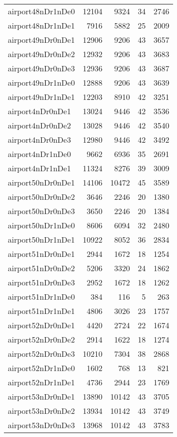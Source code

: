 \begin{tabular}{lrrrr}
airport48nDr1nDe0 & 12104 & 9324 & 34 & 2746 \\
airport48nDr1nDe1 & 7916 & 5882 & 25 & 2009 \\
airport49nDr0nDe1 & 12906 & 9206 & 43 & 3657 \\
airport49nDr0nDe2 & 12932 & 9206 & 43 & 3683 \\
airport49nDr0nDe3 & 12936 & 9206 & 43 & 3687 \\
airport49nDr1nDe0 & 12888 & 9206 & 43 & 3639 \\
airport49nDr1nDe1 & 12203 & 8910 & 42 & 3251 \\
airport4nDr0nDe1 & 13024 & 9446 & 42 & 3536 \\
airport4nDr0nDe2 & 13028 & 9446 & 42 & 3540 \\
airport4nDr0nDe3 & 12980 & 9446 & 42 & 3492 \\
airport4nDr1nDe0 & 9662 & 6936 & 35 & 2691 \\
airport4nDr1nDe1 & 11324 & 8276 & 39 & 3009 \\
airport50nDr0nDe1 & 14106 & 10472 & 45 & 3589 \\
airport50nDr0nDe2 & 3646 & 2246 & 20 & 1380 \\
airport50nDr0nDe3 & 3650 & 2246 & 20 & 1384 \\
airport50nDr1nDe0 & 8606 & 6094 & 32 & 2480 \\
airport50nDr1nDe1 & 10922 & 8052 & 36 & 2834 \\
airport51nDr0nDe1 & 2944 & 1672 & 18 & 1254 \\
airport51nDr0nDe2 & 5206 & 3320 & 24 & 1862 \\
airport51nDr0nDe3 & 2952 & 1672 & 18 & 1262 \\
airport51nDr1nDe0 & 384 & 116 & 5 & 263 \\
airport51nDr1nDe1 & 4806 & 3026 & 23 & 1757 \\
airport52nDr0nDe1 & 4420 & 2724 & 22 & 1674 \\
airport52nDr0nDe2 & 2914 & 1622 & 18 & 1274 \\
airport52nDr0nDe3 & 10210 & 7304 & 38 & 2868 \\
airport52nDr1nDe0 & 1602 & 768 & 13 & 821 \\
airport52nDr1nDe1 & 4736 & 2944 & 23 & 1769 \\
airport53nDr0nDe1 & 13890 & 10142 & 43 & 3705 \\
airport53nDr0nDe2 & 13934 & 10142 & 43 & 3749 \\
airport53nDr0nDe3 & 13968 & 10142 & 43 & 3783 \\

\end{tabular}
